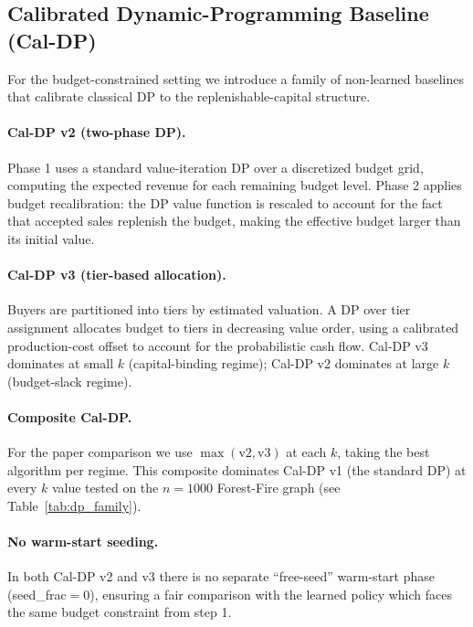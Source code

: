 \subsection{Calibrated Dynamic-Programming Baseline (Cal-DP)}
\label{sec:caldp}

For the budget-constrained setting we introduce a family of non-learned baselines
that calibrate classical DP to the replenishable-capital structure.

\paragraph{Cal-DP v2 (two-phase DP).}
Phase 1 uses a standard value-iteration DP over a discretized budget grid,
computing the expected revenue for each remaining budget level.
Phase 2 applies budget recalibration: the DP value function is rescaled to
account for the fact that accepted sales replenish the budget,
making the effective budget larger than its initial value.

\paragraph{Cal-DP v3 (tier-based allocation).}
Buyers are partitioned into tiers by estimated valuation.
A DP over tier assignment allocates budget to tiers in decreasing value order,
using a calibrated production-cost offset to account for the probabilistic cash
flow.
Cal-DP v3 dominates at small $k$ (capital-binding regime); Cal-DP v2 dominates
at large $k$ (budget-slack regime).

\paragraph{Composite Cal-DP.}
For the paper comparison we use $\max(\text{v2}, \text{v3})$ at each $k$,
taking the best algorithm per regime.
This composite dominates Cal-DP v1 (the standard DP) at every $k$ value tested
on the $n{=}1000$ Forest-Fire graph (see Table~\ref{tab:dp_family}).

\paragraph{No warm-start seeding.}
In both Cal-DP v2 and v3 there is no separate ``free-seed'' warm-start phase
(seed\_frac$=0$), ensuring a fair comparison with the learned policy which
faces the same budget constraint from step 1.

